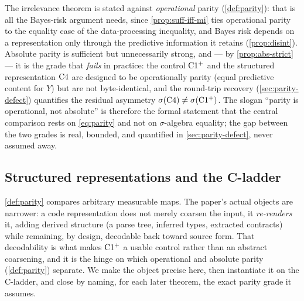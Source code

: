 \begin{remark}
\label{rem:which-parity}
The irrelevance theorem is stated against \emph{operational} parity
(\cref{def:parity}): that is all the Bayes-risk argument needs, since
\cref{prop:suff-iff-mi} ties operational parity to the equality case of the
data-processing inequality, and Bayes risk depends on a representation only
through the predictive information it retains (\cref{prop:disint}). Absolute
parity is sufficient but unnecessarily strong, and --- by
\cref{prop:abs-strict} --- it is the grade that \emph{fails} in practice: the
control $\mathrm{C1^{+}}$ and the structured representation $\mathrm{C}4$ are
designed to be operationally parity (equal predictive content for $Y$) but are
not byte-identical, and the round-trip recovery (\cref{sec:parity-defect})
quantifies the residual asymmetry $\sigma\!\left(\mathrm{C}4\right) \ne
\sigma\!\left(\mathrm{C1^{+}}\right)$. The slogan ``parity is operational, not absolute'' is
therefore the formal statement that the central comparison rests on
\eqref{eq:parity} and not on $\sigma$-algebra equality; the gap between the
two grades is real, bounded, and quantified in \cref{sec:parity-defect}, never
assumed away.
\end{remark}

\subsection{Structured representations and the C-ladder}
\label{subsec:structured}

\cref{def:parity} compares arbitrary measurable maps. The paper's actual
objects are narrower: a code representation does not merely coarsen the input,
it \emph{re-renders} it, adding derived structure (a parse tree, inferred
types, extracted contracts) while remaining, by design, decodable back toward
source form. That decodability is what makes $\mathrm{C1^{+}}$ a usable control
rather than an abstract coarsening, and it is the hinge on which operational
and absolute parity (\cref{def:parity}) separate. We make the object precise
here, then instantiate it on the C-ladder, and close by naming, for
each later theorem, the exact parity grade it assumes.

